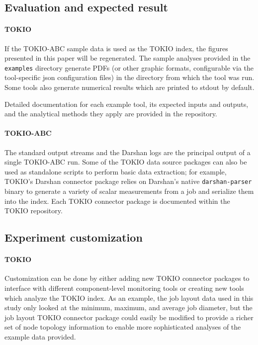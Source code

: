 \subsection{Evaluation and expected result}

\paragraph{TOKIO}
If the TOKIO-ABC sample data is used as the TOKIO index, the figures presented in this paper will be regenerated.
The sample analyses provided in the \texttt{examples} directory generate PDFs (or other graphic formats, configurable via the tool-specific json configuration files) in the directory from which the tool was run.
Some tools also generate numerical results which are printed to stdout by default.

Detailed documentation for each example tool, its expected inputs and outputs, and the analytical methods they apply are provided in the repository.

\paragraph{TOKIO-ABC}
The standard output streams and the Darshan logs are the principal output of a single TOKIO-ABC run.
Some of the TOKIO data source packages can also be used as standalone scripts to perform basic data extraction; for example, TOKIO's Darshan connector package relies on Darshan's native \texttt{darshan-parser} binary to generate a variety of scalar measurements from a job and serialize them into the index.
Each TOKIO connector package is documented within the TOKIO repository.

\subsection{Experiment customization}

\paragraph{TOKIO} Customization can be done by either adding new TOKIO connector packages to interface with different component-level monitoring tools or creating new tools which analyze the TOKIO index.
As an example, the job layout data used in this study only looked at the minimum, maximum, and average job diameter, but the job layout TOKIO connector package could easily be modified to provide a richer set of node topology information to enable more sophisticated analyses of the example data provided.

